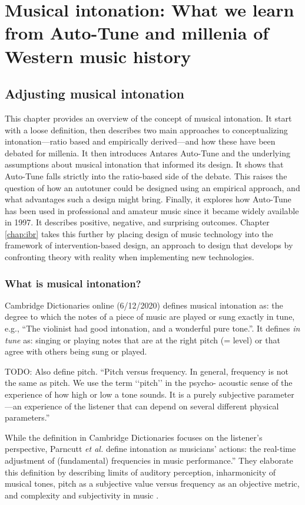 \chapter{Musical intonation: What we learn from Auto-Tune and millenia of Western music history}

\section{Adjusting musical intonation}
This chapter provides an overview of the concept of musical intonation. It start with a loose definition, then describes two main approaches to conceptualizing intonation---ratio based and empirically derived---and how these have been debated for millenia. It then introduces Antares Auto-Tune and the underlying assumptions about musical intonation that informed its design. It shows that Auto-Tune falls strictly into the ratio-based side of the debate. This raises the question of how an autotuner could be designed using an empirical approach, and what advantages such a design might bring. Finally, it explores how Auto-Tune has been used in professional and amateur music since it became widely available in 1997. It describes positive, negative, and surprising outcomes. Chapter \ref{chap:ibr} takes this further by placing design of music technology into the framework of intervention-based design, an approach to design that develops by confronting theory with reality when implementing new technologies.

\subsection{What is musical intonation?}
Cambridge Dictionaries online (6/12/2020) defines musical intonation as: the degree to which the notes of a piece of music are played or sung exactly in  tune,  e.g.,  ``The  violinist  had  good  intonation,  and a wonderful pure tone.''. It defines \textit{in tune} as: singing or playing notes that are at the right pitch (= level) or that agree with others being sung or played. 

TODO: Also define pitch. ``Pitch versus frequency. In general, frequency is not the same as pitch. We use the term ‘‘pitch’’ in the psycho- acoustic sense of the experience of how high or low    a tone sounds. It is a purely subjective parameter—an experience of the listener that can depend on several different physical parameters.'' \cite{parncutt2018psychocultural}

While the definition in Cambridge Dictionaries focuses on the listener's perspective, Parncutt \textit{et al.} define intonation as musicians' actions: the real-time adjustment of (fundamental) frequencies in music performance.'' They elaborate this definition by describing limits of auditory perception, inharmonicity of musical tones, pitch as a subjective value versus frequency as an objective metric, and complexity and subjectivity in music \cite{parncutt2018psychocultural}.


